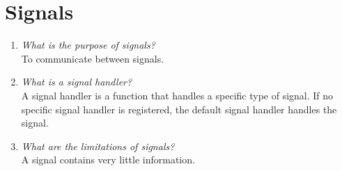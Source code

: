\documentclass[a4paper]{article}
\begin{document}
\section{Signals}
\begin{enumerate}
  \item \textit{What is the purpose of signals?} \\
    To communicate between signals.
  \item \textit{What is a signal handler?} \\
    A signal handler is a function that handles a specific type of signal. If no specific signal handler is registered, the default signal handler handles the signal.
  \item \textit{What are the limitations of signals?} \\
    A signal contains very little information.
\end{enumerate}
\end{document}
